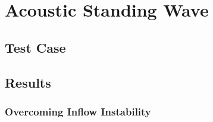 





\section{Acoustic Standing Wave}

\subsection{Test Case}




\subsection{Results}

\subsubsection{Overcoming Inflow Instability}


